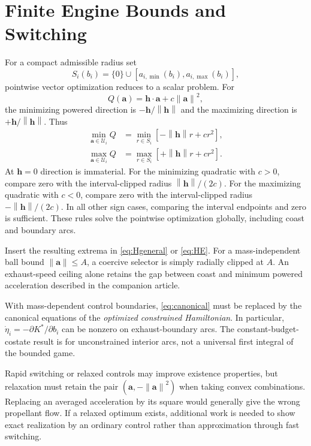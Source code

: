 \documentclass[journal,a4paper]{IEEEtran}
\newcommand{\U}{\mathcal U}
\newcommand{\norm}[1]{\left\|#1\right\|}
\begin{document}
\section{Finite Engine Bounds and Switching}
\label{sec:bounded}
For a compact admissible radius set
\begin{equation}
 S_i(b_i)=\{0\}\cup[a_{i,\min}(b_i),a_{i,\max}(b_i)],
\end{equation}
pointwise vector optimization reduces to a scalar problem. For
\begin{equation}
 Q(\mathbf a)=\mathbf h\cdot\mathbf a+c\norm{\mathbf a}^2,
\end{equation}
the minimizing powered direction is $-\mathbf h/\norm{\mathbf h}$ and the maximizing direction is $+\mathbf h/\norm{\mathbf h}$. Thus
\begin{align}
 \min_{\mathbf a\in\U_i}Q
     &=\min_{r\in S_i}[-\norm{\mathbf h}r+cr^2],\label{eq:minradius}\\
 \max_{\mathbf a\in\U_i}Q
     &=\max_{r\in S_i}[+\norm{\mathbf h}r+cr^2].\label{eq:maxradius}
\end{align}
At $\mathbf h=0$ direction is immaterial. For the minimizing quadratic with $c>0$, compare zero with the interval-clipped radius $\norm{\mathbf h}/(2c)$. For the maximizing quadratic with $c<0$, compare zero with the interval-clipped radius $-\norm{\mathbf h}/(2c)$. In all other sign cases, comparing the interval endpoints and zero is sufficient. These rules solve the pointwise optimization globally, including coast and boundary arcs.

Insert the resulting extrema in \eqref{eq:Hgeneral} or \eqref{eq:HE}. For a mass-independent ball bound $\norm{\mathbf a}\le A$, a coercive selector is simply radially clipped at $A$. An exhaust-speed ceiling alone retains the gap between coast and minimum powered acceleration described in the companion article.

With mass-dependent control boundaries, \eqref{eq:canonical} must be replaced by the canonical equations of the \emph{optimized constrained Hamiltonian}. In particular, $\dot\eta_i=-\partial K^*/\partial b_i$ can be nonzero on exhaust-boundary arcs. The constant-budget-costate result is for unconstrained interior arcs, not a universal first integral of the bounded game.

Rapid switching or relaxed controls may improve existence properties, but relaxation must retain the pair $(\mathbf a,-\norm{\mathbf a}^2)$ when taking convex combinations. Replacing an averaged acceleration by its square would generally give the wrong propellant flow. If a relaxed optimum exists, additional work is needed to show exact realization by an ordinary control rather than approximation through fast switching.
\end{document}
